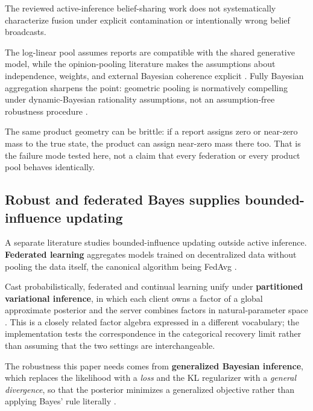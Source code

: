 \documentclass[
  english,
]{article}
\theoremstyle{plain}
\theoremstyle{definition}
\theoremstyle{remark}
\theoremstyle{definition}
\begin{document}
The reviewed active-inference belief-sharing work does not
systematically characterize fusion under explicit contamination or
intentionally wrong belief broadcasts.

The log-linear pool assumes reports are compatible with the shared
generative model, while the opinion-pooling literature makes the
assumptions about independence, weights, and external Bayesian coherence
explicit \citep{genest1986combining, genest1986externally}. Fully
Bayesian aggregation sharpens the point: geometric pooling is
normatively compelling under dynamic-Bayesian rationality assumptions,
not an assumption-free robustness procedure \citep{dietrich2021fully}.

The same product geometry can be brittle: if a report assigns zero or
near-zero mass to the true state, the product can assign near-zero mass
there too. That is the failure mode tested here, not a claim that every
federation or every product pool behaves identically.

\subsection{Robust and federated Bayes supplies bounded-influence
updating}\label{sec:intro-robust-bayes}

A separate literature studies bounded-influence updating outside active
inference. \textbf{Federated learning} aggregates models trained on
decentralized data without pooling the data itself, the canonical
algorithm being FedAvg \citep{mcmahan2017communication}.

Cast probabilistically, federated and continual learning unify under
\textbf{partitioned variational inference}, in which each client owns a
factor of a global approximate posterior and the server combines factors
in natural-parameter space
\citep{bui2018partitioned, ashman2022partitioned}. This is a closely
related factor algebra expressed in a different vocabulary; the
implementation tests the correspondence in the categorical recovery
limit rather than assuming that the two settings are interchangeable.

The robustness this paper needs comes from \textbf{generalized Bayesian
inference}, which replaces the likelihood with a \emph{loss} and the KL
regularizer with a \emph{general divergence}, so that the posterior
minimizes a generalized objective rather than applying Bayes' rule
literally
\citep{bissiri2016general, jewson2018divergence, knoblauch2022generalized}.
\end{document}

